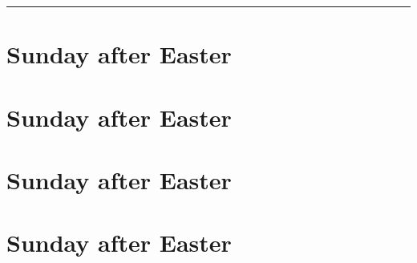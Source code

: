 {{\def\commemorations{If the Feast of the Annunciation has been transferred to the Monday following Low Sunday, \emph{First Vespers} is commemorated as on page \pageref{annunciation-commem}.  If today is April 30, May 1, or May 2, \emph{First Vespers of St Joseph the Worker} is commemorated as follows.}
\printcommemnote{}
}

\bigskip
\hrule
\medskip
{
\label{stjoseph-worker-commem}
\def\begincollectcols{\begin{parcolumns}[rulebetween,colwidths={1=0.43\linewidth}]{2}}
\def\vrlinebreak{T}

\bigskip
\benedicamusdomino{}
}

{
\section{ Sunday after Easter}
\label{easter2}
\printcommonvespers{}
\def\precollect{\printvrmanenobiscum}
\def\postmagtitle{\label{easter2-mag}}
\benedicamusdomino{}
}
{
\section{ Sunday after Easter}
\label{easter3}
\printcommonvespers{}
\def\begincollectcols{\begin{parcolumns}[rulebetween,colwidths={1=0.44\linewidth}]{2}}
\def\precollect{\printvrmanenobiscum}
\def\postmagtitle{\label{easter3-mag}}
\benedicamusdomino{}
}

{
\section{ Sunday after Easter}
\label{easter4}
\printcommonvespers{}
\def\precollect{\printvrmanenobiscum}
\def\postmagtitle{\label{easter4-mag}}
\benedicamusdomino{}
}

{
\section{ Sunday after Easter}
\label{easter5}
\printcommonvespers{}
\def\premagverses{\oldneedspace{12\baselineskip}}
\def\precollect{\printvrmanenobiscum}
\def\postmagtitle{\label{easter5-mag}}
\benedicamusdomino{}
}

}
